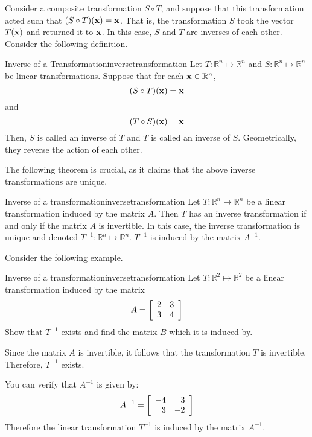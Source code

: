Consider a composite transformation $S \circ T$, and suppose that this transformation acted such that $(S \circ T) ({\bf x}) = {\bf x}$. That is, the transformation $S$ took the vector $T({\bf x})$ and returned it to ${\bf x}$. In this case, $S$ and $T$ are inverses of each other. Consider the following definition.  

\begin{definition}{Inverse of a Transformation}{inversetransformation}
Let $T: \mathbb{R}^n \mapsto \mathbb{R}^n$ and $S:\mathbb{R}^n \mapsto \mathbb{R}^n$ be linear transformations. Suppose that for each ${\bf x} \in \mathbb{R}^n$, 
\[
(S \circ T)({\bf x}) = {\bf x}
\]
and 
\[
(T \circ S)({\bf x}) = {\bf x}
\]
Then, $S$ is called an inverse of $T$  and $T$ is called an inverse of $S$. Geometrically, they reverse the action of each other. 
\end{definition}

The following theorem is crucial, as it claims that the above inverse transformations are unique. 

\begin{theorem}{Inverse of a transformation}{inversetransformation}
Let $T:\mathbb{R}^n \mapsto \mathbb{R}^n$ be a linear transformation induced by the matrix $A$. Then $T$ has an inverse transformation if and only if the matrix $A$ is invertible. In this case, the inverse transformation is unique and denoted $T^{-1}: \mathbb{R}^n \mapsto \mathbb{R}^n$. $T^{-1}$ is induced by the matrix $A^{-1}$. 
\end{theorem}

Consider the following example. 

\begin{example}{Inverse of a transformation}{inversetransformation}
Let $T: \mathbb{R}^2 \mapsto \mathbb{R}^2$ be a linear transformation induced by the matrix 
\[
A = 
\left[
\begin{array}{rr}
2 & 3 \\
3 & 4
\end{array}
\right]
\]
Show that $T^{-1}$ exists and find the matrix $B$ which it is induced by. 
\end{example}

\begin{solution}
Since the matrix $A$ is invertible, it follows that the transformation $T$ is invertible. Therefore, $T^{-1}$ exists. 

You can verify that $A^{-1}$ is given by:
\[
A^{-1}
=
\left[
\begin{array}{rr}
-4 & 3 \\
3 & -2
\end{array}
\right]
\]
Therefore the linear transformation $T^{-1}$ is induced by the matrix $A^{-1}$. 
\end{solution}
